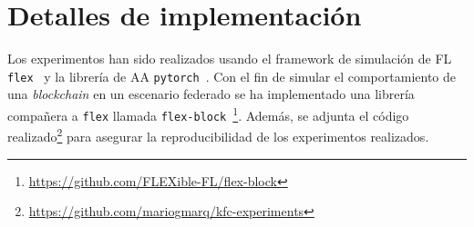 \section{Detalles de implementación}
Los experimentos han sido realizados usando el framework de simulación de \ac{FL} \texttt{flex}~\cite{flex} y la librería de \ac{AA} \texttt{pytorch}~\cite{pytorch}. Con el fin de simular el comportamiento de una \textit{blockchain} en un escenario federado se ha implementado una librería compañera a \texttt{flex} llamada \texttt{flex-block}~\cite{flex}\footnote{\url{https://github.com/FLEXible-FL/flex-block}}. Además, se adjunta el código realizado\footnote{\url{https://github.com/mariogmarq/kfc-experiments}} para asegurar la reproducibilidad de los experimentos realizados.